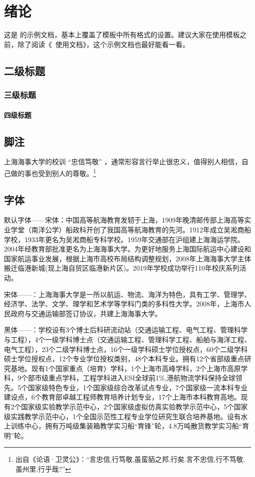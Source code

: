 \chapter{绪论}

这是 \shmtuthesis 的示例文档，基本上覆盖了模板中所有格式的设置。建议大家在使用模板之前，除了阅读《\shmtuthesis\ 使用文档》，这个示例文档也最好能看一看。

\section{二级标题}

\subsection{三级标题}

\subsubsection{四级标题}

\zhlipsum[1-2]

\section{脚注}

上海海事大学的校训 “忠信笃敬” ，通常形容言行举止很忠义，值得别人相信，自己做的事也受到别人的尊敬。\footnote{出自《论语·卫灵公》：“言忠信,行笃敬,虽蛮貊之邦,行矣.言不忠信,行不笃敬,虽州里,行乎哉?”}

\section{字体}
{默认字体——宋体：中国高等航海教育发轫于上海，1909年晚清邮传部上海高等实业学堂（南洋公学）船政科开创了我国高等航海教育的先河。1912年成立吴淞商船学校，1933年更名为吴淞商船专科学校。1959年交通部在沪组建上海海运学院。2004年经教育部批准更名为上海海事大学。为更好地服务上海国际航运中心建设和国家航运事业发展，根据上海市高校布局结构调整规划，2008年上海海事大学主体搬迁临港新城(现上海自贸区临港新片区)。2019年学校成功举行110年校庆系列活动。} 

{宋体——：\songti 上海海事大学是一所以航运、物流、海洋为特色，具有工学、管理学、经济学、法学、文学、理学和艺术学等学科门类的多科性大学。2008年，上海市人民政府与交通运输部签订协议，共建上海海事大学。}

{黑体——：\heiti 学校设有3个博士后科研流动站（交通运输工程、电气工程、管理科学与工程），4个一级学科博士点（交通运输工程、管理科学工程、船舶与海洋工程、电气工程），23个二级学科博士点，16个一级学科硕士学位授权点，60个二级学科硕士学位授权点，12个专业学位授权类别，48个本科专业。拥有12个省部级重点研究基地。现有1个国家重点（培育）学科，1个上海市高峰学科，2个上海市高原学科，9个部市级重点学科，工程学科进入ESI全球前1\%,港航物流学科保持全球领先。5个国家级特色专业，1个国家级综合改革试点专业，7个国家级一流本科专业建设点，6个教育部卓越工程师教育培养计划专业，17个上海市本科教育高地。现有2个国家级实验教学示范中心，2个国家级虚拟仿真实验教学示范中心，5个国家级实践教学示范中心，1个全国示范性工程专业学位研究生联合培养基地。设有水上训练中心，拥有万吨级集装箱教学实习船“育锋”轮，4.8万吨散货教学实习船“育明”轮。}

